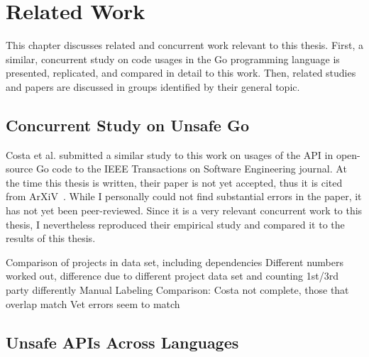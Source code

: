 
\chapter{Related Work}\label{ch:related-work}

This chapter discusses related and concurrent work relevant to this thesis.
First, a similar, concurrent study on \unsafe{} code usages in the Go programming language is presented, replicated, and
compared in detail to this work.
Then, related studies and papers are discussed in groups identified by their general topic.



\section{Concurrent Study on Unsafe Go}\label{sec:related-work:concurrent-study}

Costa et al. submitted a similar study to this work on usages of the \unsafe{} \acrshort{API} in open-source Go code to
the IEEE Transactions on Software Engineering journal.
At the time this thesis is written, their paper is not yet accepted, thus it is cited from ArXiV~\cite{costa2020}.
While I personally could not find substantial errors in the paper, it has not yet been peer-reviewed.
Since it is a very relevant concurrent work to this thesis, I nevertheless reproduced their empirical study and compared
it to the results of this thesis.

Comparison of projects in data set, including dependencies
Different numbers worked out, difference due to different project data set and counting 1st/3rd party differently
Manual Labeling Comparison: Costa not complete, those that overlap match
Vet errors seem to match







\section{Unsafe APIs Across Languages}\label{sec:related-work:unsafe-across-languages}

